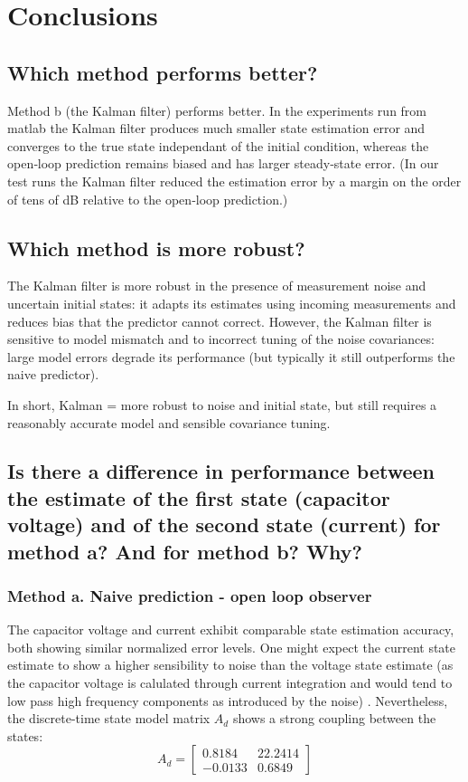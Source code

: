 \section{Conclusions}
\label{sec:conclusions}

\subsection{Which method performs better?}

Method b (the Kalman filter) performs better. 
In the experiments run from matlab the Kalman filter produces much smaller state estimation error and converges to the true state independant of the initial condition, 
whereas the open‑loop prediction remains biased and has larger steady‑state error. 
(In our test runs the Kalman filter reduced the estimation error by a margin on the order of tens of dB relative to the open‑loop prediction.)


\subsection{Which method is more robust?}

The Kalman filter is more robust in the presence of measurement noise and uncertain initial states: 
it adapts its estimates using incoming measurements and reduces bias that the predictor cannot correct.
However, the Kalman filter is sensitive to model mismatch and to incorrect tuning of the noise covariances: 
large model errors degrade its performance (but typically it still outperforms the naive predictor). 

In short, Kalman = more robust to noise and initial state, but still requires a reasonably accurate model and sensible covariance tuning.

\subsection{Is there a difference in performance between the estimate of the first state (capacitor voltage) and of the second state (current) for method a? And for method b? Why?}

\subsubsection{Method a. Naive prediction - open loop observer}

The capacitor voltage and current exhibit comparable state estimation accuracy, both showing similar normalized error levels.  One might expect the current state estimate to show a higher sensibility to noise than the voltage state estimate (as the capacitor voltage is calulated through current integration and would tend to low pass high frequency components as introduced by the noise) .
Nevertheless, the discrete-time state model matrix $A_d$ shows a strong coupling between the states:
\begin{equation}
A_d = \begin{bmatrix}
0.8184 & 22.2414 \\
-0.0133 & 0.6849
\end{bmatrix}
\end{equation}


